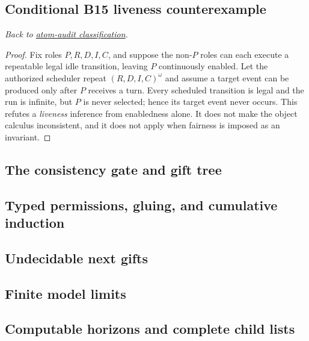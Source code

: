 \documentclass[11pt,letterpaper]{article}
\theoremstyle{definition}\newtheorem{definition}[theorem]{Definition}\newtheorem{example}[theorem]{Example}
\theoremstyle{remark}\newtheorem{remark}[theorem]{Remark}
\begin{document}
\subsection{Conditional B15 liveness counterexample}\label{w0:pr:starvation}
\textit{Back to \hyperref[w0:sec:atom-audit]{atom-audit classification}.}
\begin{proof}
Fix roles $P,R,D,I,C$, and suppose the non-$P$ roles can each execute a repeatable legal idle transition, leaving $P$ continuously enabled. Let the authorized scheduler repeat $(R,D,I,C)^\omega$ and assume a target event can be produced only after $P$ receives a turn. Every scheduled transition is legal and the run is infinite, but $P$ is never selected; hence its target event never occurs. This refutes a \emph{liveness} inference from enabledness alone. It does not make the object calculus inconsistent, and it does not apply when fairness is imposed as an invariant.
\end{proof}



\subsection*{The consistency gate and gift tree}


\subsection*{Typed permissions, gluing, and cumulative induction}


\subsection*{Undecidable next gifts}


\subsection*{Finite model limits}


\subsection*{Computable horizons and complete child lists}
\end{document}
